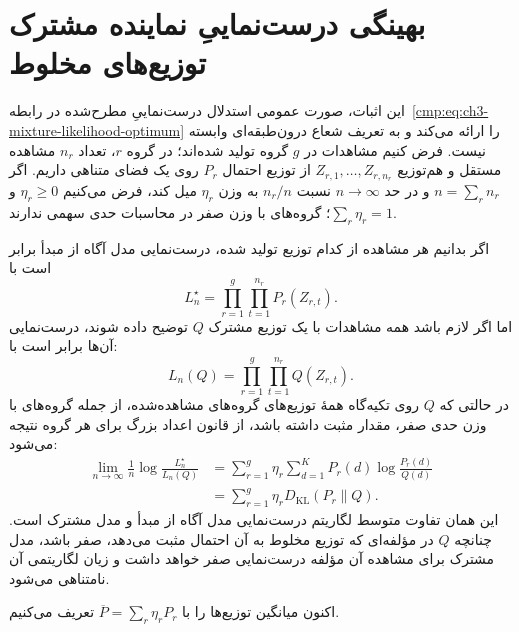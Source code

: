 \section{بهینگی درست‌نماییِ نماینده مشترک توزیع‌های مخلوط}
\label{app:ch3-mixture-likelihood}

این اثبات، صورت عمومی استدلال درست‌نماییِ مطرح‌شده در رابطه~\eqref{cmp:eq:ch3-mixture-likelihood-optimum} را ارائه می‌کند و به تعریف شعاع درون‌طبقه‌ای وابسته نیست. فرض کنیم مشاهدات در $g$ گروه تولید شده‌اند؛ در گروه $r$، تعداد $n_r$ مشاهده مستقل و هم‌توزیع $Z_{r,1},\ldots,Z_{r,n_r}$ از توزیع احتمال $P_r$ روی یک فضای متناهی داریم. اگر $n=\sum_r n_r$ و در حد $n\to\infty$ نسبت $n_r/n$ به وزن $\eta_r$ میل کند، فرض می‌کنیم $\eta_r\ge0$ و $\sum_r\eta_r=1$؛ گروه‌های با وزن صفر در محاسبات حدی سهمی ندارند.

اگر بدانیم هر مشاهده از کدام توزیع تولید شده، درست‌نمایی مدل آگاه از مبدأ برابر است با
\[
L_n^{\star}=\prod_{r=1}^{g}\prod_{t=1}^{n_r}P_r(Z_{r,t}).
\]
اما اگر لازم باشد همه مشاهدات با یک توزیع مشترک $Q$ توضیح داده شوند، درست‌نمایی آن‌ها برابر است با:
\[
L_n(Q)=\prod_{r=1}^{g}\prod_{t=1}^{n_r}Q(Z_{r,t}).
\]
در حالتی که $Q$ روی تکیه‌گاه همهٔ توزیع‌های گروه‌های مشاهده‌شده، از جمله گروه‌های با وزن حدی صفر، مقدار مثبت داشته باشد، از قانون اعداد بزرگ برای هر گروه نتیجه می‌شود:
\begin{equation}\label{eq:app-ch3-mixture-log-likelihood-ratio}
\begin{aligned}
\lim_{n\to\infty}\frac1n\log\frac{L_n^{\star}}{L_n(Q)}
&=\sum_{r=1}^{g}\eta_r
\sum_{d=1}^{K}P_r(d)\log\frac{P_r(d)}{Q(d)}\\
&=\sum_{r=1}^{g}\eta_rD_{\mathrm{KL}}(P_r\|Q).
\end{aligned}
\end{equation}
این همان تفاوت متوسط لگاریتم درست‌نمایی مدل آگاه از مبدأ و مدل مشترک است. چنانچه $Q$ در مؤلفه‌ای که توزیع مخلوط به آن احتمال مثبت می‌دهد، صفر باشد، مدل مشترک برای مشاهده آن مؤلفه درست‌نمایی صفر خواهد داشت و زیان لگاریتمی آن نامتناهی می‌شود.

اکنون میانگین توزیع‌ها را با $\overline P=\sum_r\eta_rP_r$ تعریف می‌کنیم.

